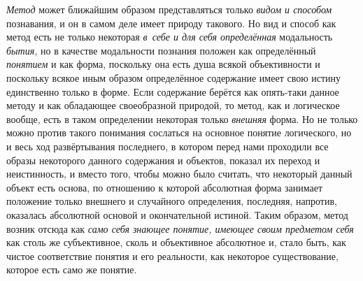 {\em Метод} может ближайшим
образом представляться только {\em видом
и способом} познавания, и он в самом деле имеет природу
такового. Но вид и способ как метод есть не только некоторая
{\em в~себе и для себя определённая}
модальность {\em бытия,}
но в качестве модальности познания положен как определённый
{\em понятием} и как
форма, поскольку она есть душа всякой объективности и поскольку всякое иным
образом определённое содержание имеет свою истину единственно только в
форме. Если содержание берётся как опять-таки данное методу и как
обладающее своеобразной природой, то метод, как и логическое вообще, есть в
таком определении некоторая только
{\em внешняя} форма. Но
не только можно против такого понимания сослаться на основное понятие
логического, но и весь ход развёртывания последнего, в котором перед нами
проходили все образы некоторого данного содержания и объектов, показал их
переход и неистинность, и вместо того, чтобы можно было считать, что
некоторый данный объект есть основа, по отношению к которой абсолютная
форма занимает положение только внешнего и случайного определения,
последняя, напротив, оказалась абсолютной основой и окончательной истиной.
Таким образом, метод возник отсюда как
{\em само себя знающее понятие, имеющее
своим предметом себя} как столь же субъективное, сколь и
объективное абсолютное и, стало быть, как чистое соответствие понятия и его
реальности, как некоторое существование, которое есть само же понятие.

